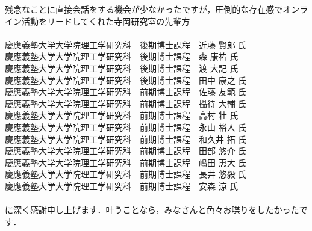 {残念なことに直接会話をする機会が少なかったですが，圧倒的な存在感でオンライン活動をリードしてくれた寺岡研究室の先輩方\\
\\
\hspace{1cm}慶應義塾大学大学院理工学研究科　後期博士課程　近藤 賢郎 氏\\
\hspace{1cm}慶應義塾大学大学院理工学研究科　後期博士課程　森 康祐 氏\\
\hspace{1cm}慶應義塾大学大学院理工学研究科　後期博士課程　渡 大記 氏\\
\hspace{1cm}慶應義塾大学大学院理工学研究科　後期博士課程　田中 康之 氏\\
\hspace{1cm}慶應義塾大学大学院理工学研究科　前期博士課程　佐藤 友範 氏\\
\hspace{1cm}慶應義塾大学大学院理工学研究科　前期博士課程　攝待 大輔 氏\\
\hspace{1cm}慶應義塾大学大学院理工学研究科　前期博士課程　高村 壮 氏\\
\hspace{1cm}慶應義塾大学大学院理工学研究科　前期博士課程　永山 裕人 氏\\
\hspace{1cm}慶應義塾大学大学院理工学研究科　前期博士課程　和久井 拓 氏\\
\hspace{1cm}慶應義塾大学大学院理工学研究科　前期博士課程　田部 悠介 氏\\
\hspace{1cm}慶應義塾大学大学院理工学研究科　前期博士課程　嶋田 恵大 氏\\
\hspace{1cm}慶應義塾大学大学院理工学研究科　前期博士課程　長井 悠毅 氏\\
\hspace{1cm}慶應義塾大学大学院理工学研究科　前期博士課程　安森 涼 氏\\
\\
に深く感謝申し上げます．叶うことなら，みなさんと色々お喋りをしたかったです．\\

}
